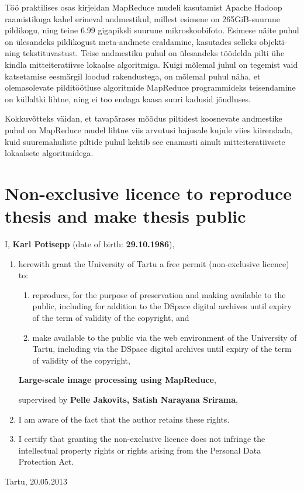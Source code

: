 \documentclass [12pt,a4paper]{report}
\begin{document}
Töö praktilises osas kirjeldan MapReduce mudeli kasutamist Apache Hadoop raamistikuga kahel erineval andmestikul, millest esimene on 265GiB-suurune pildikogu, ning teine 6.99 gigapiksli suurune mikroskoobifoto. Esimese näite puhul on ülesandeks pildikogust meta-andmete eraldamine, kasutades selleks objekti- ning tekstituvastust. Teise andmestiku puhul on ülesandeks töödelda pilti ühe kindla mitteiteratiivse lokaalse algoritmiga. Kuigi mõlemal juhul on tegemist vaid katsetamise eesmärgil loodud rakendustega, on mõlemal puhul näha, et olemasolevate pilditöötluse algoritmide MapReduce programmideks teisendamine on küllaltki lihtne, ning ei too endaga kaasa suuri kadusid jõudluses.

Kokkuvõtteks väidan, et tavapärases mõõdus piltidest koosnevate andmestike puhul on MapReduce mudel lihtne viis arvutusi hajusale kujule viies kiirendada, kuid suuremahuliste piltide puhul kehtib see enamasti ainult mitteiteratiivsete lokaalsete algoritmidega.

\clearpage
{}



\chapter*{Non-exclusive licence to reproduce thesis and make thesis public}

I, \textbf{Karl Potisepp} (date of birth: \textbf{29.10.1986}),

\begin{enumerate}
\item herewith grant the University of Tartu a free permit (non-exclusive licence) to:

\begin{enumerate}
\item reproduce, for the purpose of preservation and making available to the public, including for addition to the DSpace digital archives until expiry of the term of validity of the copyright, and

\item make available to the public via the web environment of the University of Tartu, including via the DSpace digital archives until expiry of the term of validity of the copyright,
\end{enumerate}

\begin{center}
\textbf{Large-scale image processing using MapReduce},
\end{center}

supervised by \textbf{Pelle Jakovits, Satish Narayana Srirama},

\item I am aware of the fact that the author retains these rights.

\item I certify that granting the non-exclusive licence does not infringe the intellectual property rights or rights arising from the Personal Data Protection Act. 
\end{enumerate}



Tartu, 20.05.2013
\end{document}
